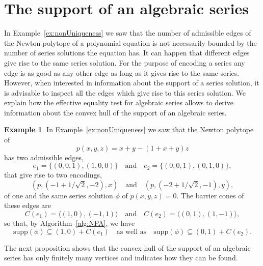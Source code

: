 \documentclass[a4paper,draft]{amsart}
\theoremstyle{definition}
\newtheorem{Example}{Example}
\begin{document}
\section{The support of an algebraic series}\label{sub:support}
In Example~\ref{ex:nonUniqueness} we saw that the number of admissible edges of the Newton polytope of a polynomial equation is not necessarily bounded by the number of series solutions the equation has. It can happen that different edges give rise to the same series solution. For the purpose of encoding a series any edge is as good as any other edge as long as it gives rise to the same series. However, when interested in information about the support of a series solution, it is advisable to inspect all the edges which give rise to this series solution. We explain how the effective equality test for algebraic series allows to derive information about the convex hull of the support of an algebraic series.

\begin{Example}\label{ex:cones}\label{ex:support}
In Example~\ref{ex:nonUniqueness} we saw that the Newton polytope of 
\begin{equation*}
p(x,y,z) = x+y - (1+x+y) z
\end{equation*}
has two admissible edges,
\begin{equation*}
e_1 = \{(0,0,1),(1,0,0)\} \quad \text{and} \quad e_2 = \{(0,0,1),(0,1,0)\},
\end{equation*}
that give rise to two encodings, 
\begin{equation*}
(p, (-1+1/\sqrt{2},-2),x) \quad \text{and} \quad (p, (-2+1/\sqrt{2},-1),y), 
\end{equation*}
of one and the same series solution $\phi$ of $p(x,y,z) = 0$. The barrier cones of these edges are 
\begin{equation*}
C(e_1) = \langle (1,0),(-1,1)\rangle \quad \text{and} \quad  C(e_2) = \langle (0,1),(1,-1) \rangle,
\end{equation*}
so that, by Algorithm~\ref{alg:NPA}, we have 
\begin{equation*}
\mathrm{supp}(\phi) \subseteq (1,0) + C(e_1) \quad \text{as well as} \quad \mathrm{supp}(\phi) \subseteq (0,1) + C(e_2).
\end{equation*}
\end{Example}

The next proposition shows that the convex hull of the support of an algebraic series has only finitely many vertices and indicates how they can be found. 
\end{document}
